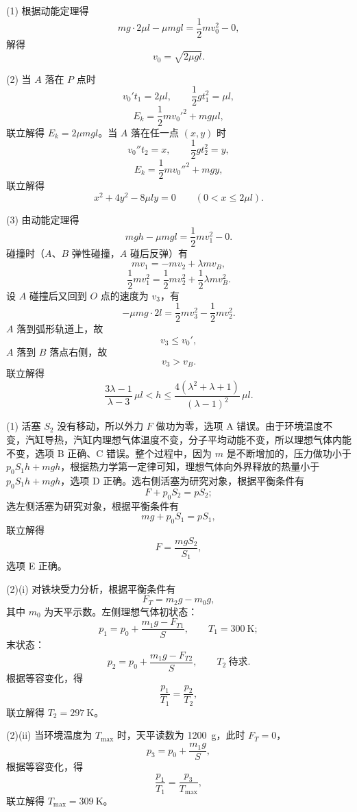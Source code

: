 \begin{answer}
(1) 根据动能定理得
\[
  mg\cdot 2\mu l-\mu mgl=\frac{1}{2}mv_{0}^{2}-0,
\]
解得
\[
  v_{0}=\sqrt{2\mu gl}.
\]

(2) 当 $A$ 落在 $P$ 点时
\[
  v_{0}'t_{1}=2\mu l,\qquad \frac{1}{2}gt_{1}^{2}=\mu l,
\]
\[
  E_{k}=\frac{1}{2}mv_{0}'^{2}+mg\mu l,
\]
联立解得 $E_{k}=2\mu mgl$。当 $A$ 落在任一点 $(x,y)$ 时
\[
  v_{0}''t_{2}=x,\qquad \frac{1}{2}gt_{2}^{2}=y,
\]
\[
  E_{k}=\frac{1}{2}mv_{0}''^{2}+mgy,
\]
联立解得
\[
  x^{2}+4y^{2}-8\mu ly=0\qquad(0<x\le2\mu l).
\]

(3) 由动能定理得
\[
  mgh-\mu mgl=\frac{1}{2}mv_{1}^{2}-0.
\]
碰撞时（$A$、$B$ 弹性碰撞，$A$ 碰后反弹）有
\[
  mv_{1}=-mv_{2}+\lambda mv_{B},
\]
\[
  \frac{1}{2}mv_{1}^{2}=\frac{1}{2}mv_{2}^{2}+\frac{1}{2}\lambda mv_{B}^{2}.
\]
设 $A$ 碰撞后又回到 $O$ 点的速度为 $v_{3}$，有
\[
  -\mu mg\cdot 2l=\frac{1}{2}mv_{3}^{2}-\frac{1}{2}mv_{2}^{2}.
\]
$A$ 落到弧形轨道上，故
\[
  v_{3}\le v_{0}',
\]
$A$ 落到 $B$ 落点右侧，故
\[
  v_{3}>v_{B}.
\]
联立解得
\[
  \frac{3\lambda-1}{\lambda-3}\,\mu l<h\le\frac{4(\lambda^{2}+\lambda+1)}{(\lambda-1)^{2}}\,\mu l.
\]
\end{answer}

\begin{answer}
(1) 活塞 $S_{2}$ 没有移动，所以外力 $F$ 做功为零，选项 A 错误。由于环境温度不变，汽缸导热，汽缸内理想气体温度不变，分子平均动能不变，所以理想气体内能不变，选项 B 正确、C 错误。整个过程中，因为 $m$ 是不断增加的，压力做功小于 $p_{0}S_{1}h+mgh$，根据热力学第一定律可知，理想气体向外界释放的热量小于 $p_{0}S_{1}h+mgh$，选项 D 正确。选右侧活塞为研究对象，根据平衡条件有
\[
  F+p_{0}S_{2}=pS_{2};
\]
选左侧活塞为研究对象，根据平衡条件有
\[
  mg+p_{0}S_{1}=pS_{1},
\]
联立解得
\[
  F=\frac{mgS_{2}}{S_{1}},
\]
选项 E 正确。

(2)(i) 对铁块受力分析，根据平衡条件有
\[
  F_{T}=m_{2}g-m_{0}g,
\]
其中 $m_{0}$ 为天平示数。左侧理想气体初状态：
\[
  p_{1}=p_{0}+\frac{m_{1}g-F_{T1}}{S},\qquad T_{1}=\SI{300}{\kelvin};
\]
末状态：
\[
  p_{2}=p_{0}+\frac{m_{1}g-F_{T2}}{S},\qquad T_{2}\ \text{待求}.
\]
根据等容变化，得
\[
  \frac{p_{1}}{T_{1}}=\frac{p_{2}}{T_{2}},
\]
联立解得 $T_{2}=\SI{297}{\kelvin}$。

(2)(ii) 当环境温度为 $T_{\max}$ 时，天平读数为 \SI{1200}{\gram}，此时 $F_{T}=0$，
\[
  p_{3}=p_{0}+\frac{m_{1}g}{S},
\]
根据等容变化，得
\[
  \frac{p_{1}}{T_{1}}=\frac{p_{3}}{T_{\max}},
\]
联立解得 $T_{\max}=\SI{309}{\kelvin}$。
\end{answer}

